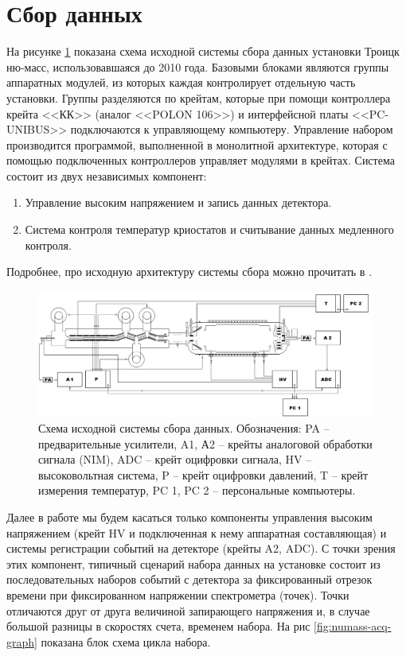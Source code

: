 \documentclass[a4paper,14pt]{extreport}
\begin{document}
\section{Сбор данных}

На рисунке \ref{fig:numass-acquisition-old} показана схема исходной системы сбора данных установки Троицк ню-масс, использовавшаяся до 2010 года. Базовыми блоками являются группы аппаратных модулей, из которых каждая контролирует отдельную часть установки. Группы разделяются по крейтам, которые при помощи контроллера крейта <<КК>> (аналог <<POLON 106>>) и интерфейсной платы <<PC-UNIBUS>> подключаются к управляющему компьютеру. Управление набором производится программой, выполненной в монолитной архитектуре, которая с помощью подключенных контроллеров управляет модулями в крейтах. Система состоит из двух независимых компонент:
\begin{enumerate}
    \item Управление высоким напряжением и запись данных детектора.
    \item Система контроля температур криостатов и  считывание данных медленного контроля.
\end{enumerate}
Подробнее, про исходную архитектуру системы сбора можно прочитать в \cite{zadorogny}.

\begin{figure}
  \centering
  \includegraphics[width = 0.99\textwidth]{img/nu_mass_setup/acquisition-old.png}
    \caption{Схема исходной системы сбора данных. Обозначения: PA – предварительные усилители, A1, А2 – крейты аналоговой обработки сигнала (NIM), ADC – крейт оцифровки сигнала, HV – высоковольтная система, P – крейт оцифровки давлений, T – крейт измерения температур, PC 1, PC 2 – персональные компьютеры.}
    \label{fig:numass-acquisition-old}
\end{figure}

Далее в работе мы будем касаться только компоненты управления высоким напряжением (крейт HV и подключенная к нему аппаратная составляющая) и системы регистрации событий на детекторе (крейты A2, ADC). С точки зрения этих компонент, типичный сценарий набора данных на установке состоит из последовательных наборов событий с детектора за фиксированный отрезок времени при фиксированном напряжении спектрометра (точек). Точки отличаются друг от друга величиной запирающего напряжения и, в случае большой разницы в скоростях счета, временем набора. На рис \ref{fig:numass-acq-graph} показана блок схема цикла набора.
\end{document}
